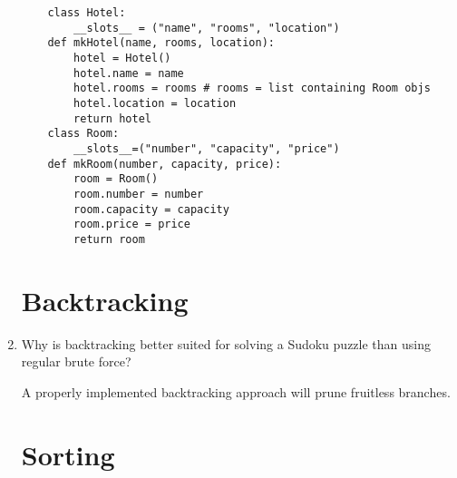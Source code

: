 \documentclass[11pt]{article}
\newenvironment{answer}{\large\lstset{basicstyle=\tiny\ttfamily}\color{white}}{}
\newenvironment{answer}{\large\lstset{basicstyle=\large\ttfamily}\color{red}}{}
\begin{document}
\begin{enumerate}
	\small
	\begin{answer}
	\begin{lstlisting}
	class Hotel:
		__slots__ = ("name", "rooms", "location")
	def mkHotel(name, rooms, location):
		hotel = Hotel()
		hotel.name = name
		hotel.rooms = rooms # rooms = list containing Room objs
		hotel.location = location
		return hotel
	class Room:
		__slots__=("number", "capacity", "price")
	def mkRoom(number, capacity, price):
		room = Room()
		room.number = number
		room.capacity = capacity
		room.price = price
		return room
	\end{lstlisting}
	\end{answer}
	\normalsize
	
	
	
	
	\section*{Backtracking}
	
	\item Why is backtracking better suited for solving a Sudoku puzzle than
	      using regular brute force?
	
	\begin{answer}
	A properly implemented backtracking approach will prune fruitless branches. 
	\end{answer}

\newpage
\section*{Sorting}


\end{enumerate}
\end{document}
